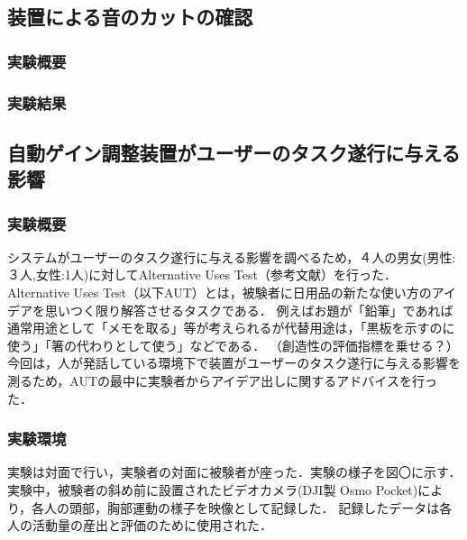 \documentclass[a4paper]{jarticle}
\begin{document}
\subsection{装置による音のカットの確認}
\subsubsection{実験概要}
\subsubsection{実験結果}
\subsection{自動ゲイン調整装置がユーザーのタスク遂行に与える影響}
\subsubsection{実験概要}
システムがユーザーのタスク遂行に与える影響を調べるため，４人の男女(男性:３人,女性:1人)に対してAlternative Uses Test（参考文献）を行った．
Alternative Uses Test（以下AUT）とは，被験者に日用品の新たな使い方のアイデアを思いつく限り解答させるタスクである．
例えばお題が「鉛筆」であれば通常用途として「メモを取る」等が考えられるが代替用途は，「黒板を示すのに使う」「箸の代わりとして使う」などである．
（創造性の評価指標を乗せる？）
今回は，人が発話している環境下で装置がユーザーのタスク遂行に与える影響を測るため，AUTの最中に実験者からアイデア出しに関するアドバイスを行った．
\subsubsection{実験環境}
実験は対面で行い，実験者の対面に被験者が座った．実験の様子を図〇に示す．
実験中，被験者の斜め前に設置されたビデオカメラ(DJI製 Osmo Pocket)により，各人の頭部，胸部運動の様子を映像として記録した．
記録したデータは各人の活動量の産出と評価のために使用された．
\end{document}
